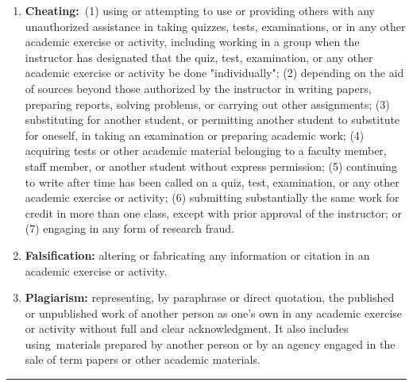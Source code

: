 \documentclass[10pt,fleqn]{article}
\begin{document}
\medskip

\noindent
\begin{enumerate}
  \item {\bf Cheating:}\ (1) using or attempting to use or providing others with
        any unauthorized assistance in taking quizzes, tests, examinations, or
        in any other academic exercise or activity, including working in a group
        when the instructor has designated that the quiz, test, examination, or
        any other academic exercise or activity be done "individually";
        (2) depending on the aid of sources beyond those authorized by the
        instructor in writing papers, preparing reports, solving problems, or
        carrying out other assignments; (3) substituting for another student, or
        permitting another student to substitute for oneself, in taking an
        examination or preparing academic work; (4) acquiring tests or other
        academic material belonging to a faculty member, staff member, or
        another student without express permission; (5) continuing to write
        after time has been called on a quiz, test, examination, or any other
        academic exercise or activity; (6) submitting substantially the same
        work for credit in more than one class, except with prior approval of
        the instructor; or (7) engaging in any form of research fraud.
  \item {\bf Falsification:} altering or fabricating any information or
        citation in an academic exercise or activity.
  \item {\bf Plagiarism:} representing, by paraphrase or direct quotation, the
        published or unpublished work of another person as one's own in any
        academic exercise or activity without full and clear acknowledgment. It
        also includes using materials prepared by another person or by an
        agency engaged in the sale of term papers or other academic materials.
\end{enumerate}

\medskip

\vskip0.1in\hrule\vskip0.1in
\end{document}
